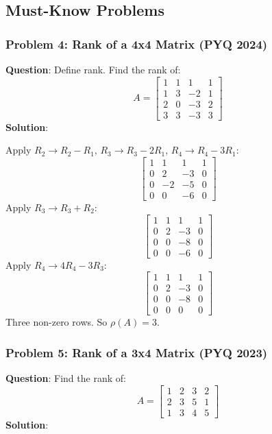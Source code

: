 \documentclass[
]{article}
\begin{document}
\subsection{Must-Know Problems}\label{must-know-problems}

\subsubsection{Problem 4: Rank of a 4x4 Matrix (PYQ
2024)}\label{problem-4-rank-of-a-4x4-matrix-pyq-2024}

\textbf{Question}: Define rank. Find the rank of:
\[
A =
\begin{bmatrix}
1 & 1 & 1 & 1 \\
1 & 3 & -2 & 1 \\
2 & 0 & -3 & 2 \\
3 & 3 & -3 & 3
\end{bmatrix}
\]
\textbf{Solution}:

Apply \(R_2 \to R_2 - R_1\), \(R_3 \to R_3 - 2R_1\),
\(R_4 \to R_4 - 3R_1\):
\[
\begin{bmatrix}
1 & 1 & 1 & 1 \\
0 & 2 & -3 & 0 \\
0 & -2 & -5 & 0 \\
0 & 0 & -6 & 0
\end{bmatrix}
\]
Apply \(R_3 \to R_3 + R_2\):
\[
\begin{bmatrix}
1 & 1 & 1 & 1 \\
0 & 2 & -3 & 0 \\
0 & 0 & -8 & 0 \\
0 & 0 & -6 & 0
\end{bmatrix}
\]
Apply \(R_4 \to 4R_4 - 3R_3\):
\[
\begin{bmatrix}
1 & 1 & 1 & 1 \\
0 & 2 & -3 & 0 \\
0 & 0 & -8 & 0 \\
0 & 0 & 0 & 0
\end{bmatrix}
\]
Three non-zero rows. So \(\rho(A) = 3\).

\subsubsection{Problem 5: Rank of a 3x4 Matrix (PYQ
2023)}\label{problem-5-rank-of-a-3x4-matrix-pyq-2023}

\textbf{Question}: Find the rank of:
\[
A =
\begin{bmatrix}
1 & 2 & 3 & 2 \\
2 & 3 & 5 & 1 \\
1 & 3 & 4 & 5
\end{bmatrix}
\]
\textbf{Solution}:
\end{document}
